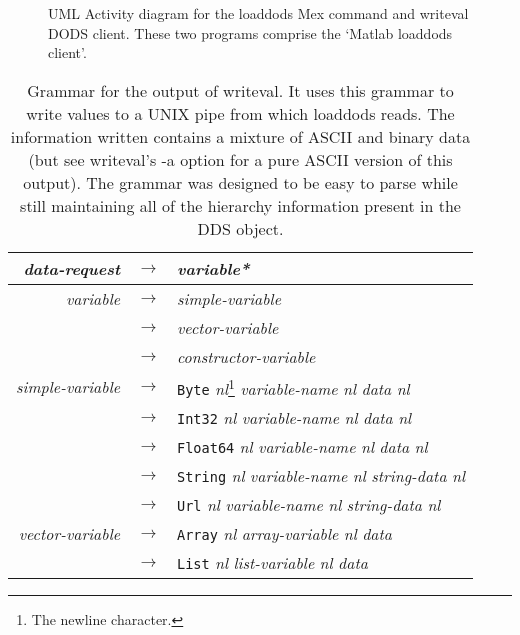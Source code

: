 \documentclass{article}
\begin{document}
\begin{figure}
\begin{center}
\caption{UML Activity diagram for the loaddods Mex command and writeval DODS
  client. These two programs comprise the `Matlab loaddods client'.}
\label{fig:loaddods-writeval-activity}
\end{center}
\end{figure}

\begin{table}

\caption{Grammar for the output of writeval. It uses this grammar to write
  values to a UNIX pipe from which loaddods reads. The information written
  contains a mixture of ASCII and binary data (but see writeval's -a option
  for a pure ASCII version of this output). The grammar was designed to be
  easy to parse while still maintaining all of the hierarchy information
  present in the DDS object.}
\label{tab:writeval-grammar}
\begin{minipage}{\linewidth}
\begin{center}
\begin{tabular} {|rcl|} \hline
\emph{data-request} 
& $\rightarrow$ & \emph{variable*} \\ \hline

\emph{variable} 
& $\rightarrow$ & \emph{simple-variable} \\
& $\rightarrow$ & \emph{vector-variable} \\
& $\rightarrow$ & \emph{constructor-variable} \\ \hline

\emph{simple-variable} 
& $\rightarrow$ & \texttt{Byte} \emph{nl}\protect\footnote{The newline character.} \emph{variable-name} \emph{nl} \emph{data} \emph{nl} \\
& $\rightarrow$ & \texttt{Int32} \emph{nl} \emph{variable-name} \emph{nl} \emph{data} \emph{nl} \\
& $\rightarrow$ & \texttt{Float64} \emph{nl} \emph{variable-name} \emph{nl}  \emph{data} \emph{nl} \\
& $\rightarrow$ & \texttt{String} \emph{nl} \emph{variable-name} \emph{nl} \emph{string-data} \emph{nl}\\ 
& $\rightarrow$ & \texttt{Url} \emph{nl} \emph{variable-name} \emph{nl} \emph{string-data} \emph{nl} \\ \hline

\emph{vector-variable} 
& $\rightarrow$ & \texttt{Array} \emph{nl} \emph{array-variable} \emph{nl} \emph{data} \\
& $\rightarrow$ & \texttt{List} \emph{nl} \emph{list-variable} \emph{nl} \emph{data} \\ \hline


\end{tabular}
\end{center}
\end{minipage}
\end{table}
\end{document}
